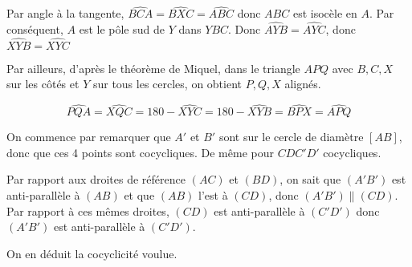 \begin{sol}
Par angle à la tangente, $\widehat{BCA}=\widehat{BXC}=\widehat{ABC}$ donc $ABC$ est isocèle en $A$. Par conséquent, $A$ est le pôle sud de $Y$ dans $YBC$. Donc $\widehat{AYB}=\widehat{AYC}$, donc $\widehat{XYB}=\widehat{XYC}$

Par ailleurs, d'après le théorème de Miquel, dans le triangle $APQ$ avec $B,C,X$ sur les côtés et $Y$ sur tous les cercles, on obtient $P,Q,X$ alignés.

$$\widehat{PQA}=\widehat{XQC}=180-\widehat{XYC}=180-\widehat{XYB}=\widehat{BPX}=\widehat{APQ}$$
\end{sol}


\begin{sol}
On commence par remarquer que $A'$ et $B'$ sont sur le cercle de diamètre $[AB]$, donc que ces 4 points sont cocycliques. De même pour $CDC'D'$ cocycliques.

Par rapport aux droites de référence $(AC)$ et $(BD)$, on sait que $(A'B')$ est anti-parallèle à $(AB)$ et que $(AB)$ l'est à $(CD)$, donc $(A'B')\parallel(CD)$. Par rapport à ces mêmes droites, $(CD)$ est anti-parallèle à $(C'D')$ donc $(A'B')$ est anti-parallèle à $(C'D')$.

On en déduit la cocyclicité voulue.
\end{sol}